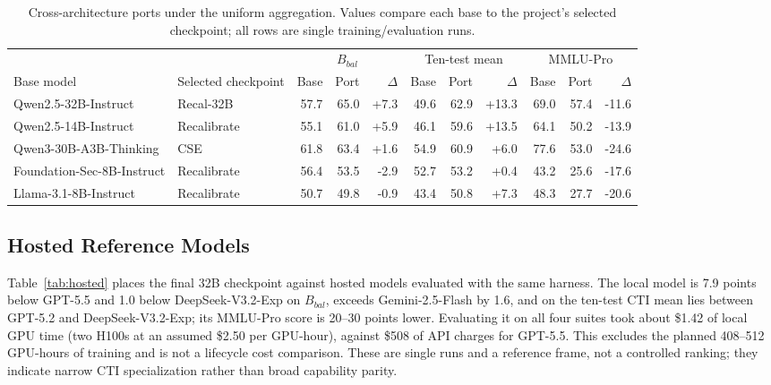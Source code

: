\documentclass[conference]{IEEEtran}
\begin{document}
\begin{table}[t]
\caption{Cross-architecture ports under the uniform aggregation. Values compare each base to the project's selected checkpoint; all rows are single training/evaluation runs.}
\label{tab:ports}
\centering
\scriptsize
\setlength{\tabcolsep}{3.3pt}
\begin{tabular}{@{}llrrrrrrrrr@{}}
\toprule
& & \multicolumn{3}{c}{$B_{bal}$} & \multicolumn{3}{c}{Ten-test mean} & \multicolumn{3}{c}{MMLU-Pro} \\
Base model & Selected checkpoint & Base & Port & $\Delta$ & Base & Port & $\Delta$ & Base & Port & $\Delta$ \\
\midrule
Qwen2.5-32B-Instruct & Recal-32B & 57.7 & 65.0 & +7.3 & 49.6 & 62.9 & +13.3 & 69.0 & 57.4 & -11.6 \\
Qwen2.5-14B-Instruct & Recalibrate & 55.1 & 61.0 & +5.9 & 46.1 & 59.6 & +13.5 & 64.1 & 50.2 & -13.9 \\
Qwen3-30B-A3B-Thinking & CSE & 61.8 & 63.4 & +1.6 & 54.9 & 60.9 & +6.0 & 77.6 & 53.0 & -24.6 \\
Foundation-Sec-8B-Instruct & Recalibrate & 56.4 & 53.5 & -2.9 & 52.7 & 53.2 & +0.4 & 43.2 & 25.6 & -17.6 \\
Llama-3.1-8B-Instruct & Recalibrate & 50.7 & 49.8 & -0.9 & 43.4 & 50.8 & +7.3 & 48.3 & 27.7 & -20.6 \\
\bottomrule
\end{tabular}
\end{table}

\subsection{Hosted Reference Models}
Table~\ref{tab:hosted} places the final 32B checkpoint against hosted models evaluated with the same harness. The local model is 7.9 points below GPT-5.5 and 1.0 below DeepSeek-V3.2-Exp on $B_{bal}$, exceeds Gemini-2.5-Flash by 1.6, and on the ten-test CTI mean lies between GPT-5.2 and DeepSeek-V3.2-Exp; its MMLU-Pro score is 20--30 points lower. Evaluating it on all four suites took about \$1.42 of local GPU time (two H100s at an assumed \$2.50 per GPU-hour), against \$508 of API charges for GPT-5.5. This excludes the planned 408--512 GPU-hours of training and is not a lifecycle cost comparison. These are single runs and a reference frame, not a controlled ranking; they indicate narrow CTI specialization rather than broad capability parity.
\end{document}
